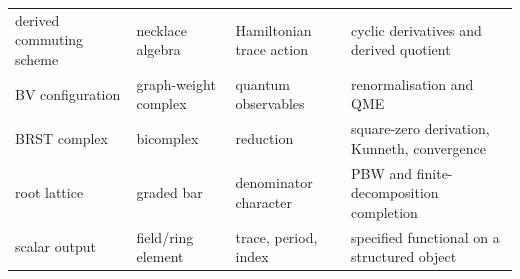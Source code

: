 \begin{longtable}{p{}p{}p{}p{}}
derived commuting scheme & necklace algebra & Hamiltonian trace action & cyclic derivatives and derived quotient\\
BV configuration & graph-weight complex & quantum observables & renormalisation and QME\\
BRST complex & bicomplex & reduction & square-zero derivation, Kunneth, convergence\\
root lattice & graded bar & denominator character & PBW and finite-decomposition completion\\
scalar output & field/ring element & trace, period, index & specified functional on a structured object\\
\bottomrule
\end{longtable}
